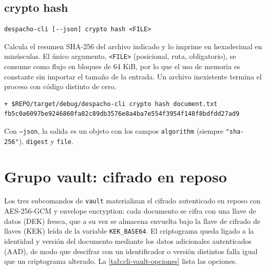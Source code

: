 \subsection{crypto hash}

\begin{lstlisting}[numbers=none]
despacho-cli [--json] crypto hash <FILE>
\end{lstlisting}

Calcula el resumen SHA-256 del archivo indicado y lo imprime en hexadecimal en minúsculas. El único argumento, \texttt{<FILE>} (posicional, ruta, obligatorio), se consume como flujo en bloques de 64 KiB, por lo que el uso de memoria es constante sin importar el tamaño de la entrada. Un archivo inexistente termina el proceso con código distinto de cero.

\begin{lstlisting}[numbers=none]
+ $REPO/target/debug/despacho-cli crypto hash document.txt
fb5c0a6097be9246860fa82c89db3576e8a4ba7e554f3954f148f8bdfdd27ad9
\end{lstlisting}

Con \texttt{--json}, la salida es un objeto con los campos \texttt{algorithm} (siempre \texttt{"sha-256"}), \texttt{digest} y \texttt{file}.

\section{Grupo vault: cifrado en reposo}\label{sec:cli-vault}

Los tres subcomandos de \texttt{vault} materializan el cifrado autenticado en reposo con AES-256-GCM y envelope encryption: cada documento se cifra con una llave de datos (DEK) fresca, que a su vez se almacena envuelta bajo la llave de cifrado de llaves (KEK) leída de la variable \texttt{KEK\_BASE64}. El criptograma queda ligado a la identidad y versión del documento mediante los datos adicionales autenticados (AAD), de modo que descifrar con un identificador o versión distintos falla igual que un criptograma alterado. La \cref{tab:cli-vault-opciones} lista las opciones.

